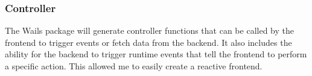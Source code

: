 \subsubsection*{Controller}

The Wails package will generate controller functions that can be called by the frontend to trigger events or fetch data from the backend. It also includes the ability for the backend to trigger runtime events that tell the frontend to perform a specific action. This allowed me to easily create a reactive frontend.
